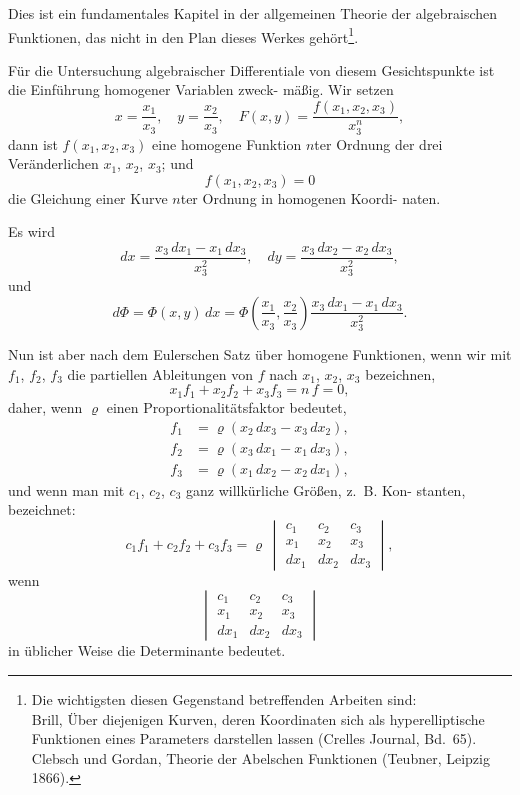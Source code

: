 \documentclass[12pt,a4paper]{book}
\theoremstyle{definition}
\begin{document}
Dies ist ein fundamentales Kapitel in der allgemeinen
Theorie der algebraischen Funktionen, das nicht in den Plan
dieses Werkes geh\"ort\footnote{Die wichtigsten diesen Gegenstand betreffenden Arbeiten sind:\\
Brill, \"Uber diejenigen Kurven, deren Koordinaten sich als hyperelliptische\\
Funktionen eines Parameters darstellen lassen (Crelles Journal, Bd.~65).\\
Clebsch und Gordan, Theorie der Abelschen Funktionen (Teubner, Leipzig 1866).}.

F\"ur die Untersuchung algebraischer Differentiale von diesem
Gesichtspunkte ist die Einf\"uhrung homogener Variablen zweck-
m\"a\ss ig. Wir setzen
\[
x = \frac{x_1}{x_3}, \quad y = \frac{x_2}{x_3}, \quad F(x,y) = \frac{f(x_1, x_2, x_3)}{x_3^n},
\]
dann ist $f(x_1, x_2, x_3)$ eine homogene Funktion $n$ter Ordnung
der drei Ver\"anderlichen $x_1$, $x_2$, $x_3$; und
\begin{equation}
f(x_1, x_2, x_3) = 0 \tag{3}
\end{equation}
die Gleichung einer Kurve $n$ter Ordnung in homogenen Koordi-
naten.

Es wird
\[
dx = \frac{x_3\,dx_1 - x_1\,dx_3}{x_3^2}, \quad dy = \frac{x_3\,dx_2 - x_2\,dx_3}{x_3^2},
\]
und
\begin{equation}
d\Phi = \Phi(x,y)\,dx = \Phi\left(\frac{x_1}{x_3}, \frac{x_2}{x_3}\right) \frac{x_3\,dx_1 - x_1\,dx_3}{x_3^2}. \tag{4}
\end{equation}

Nun ist aber nach dem Eulerschen Satz \"uber homogene
Funktionen, wenn wir mit $f_1$, $f_2$, $f_3$ die partiellen Ableitungen
von $f$ nach $x_1$, $x_2$, $x_3$ bezeichnen,
\[
x_1 f_1 + x_2 f_2 + x_3 f_3 = n\,f = 0,
\]
daher, wenn $\varrho$ einen Proportionalit\"atsfaktor bedeutet,
\[
\begin{aligned}
f_1 &= \varrho(x_2\,dx_3 - x_3\,dx_2),\\
f_2 &= \varrho(x_3\,dx_1 - x_1\,dx_3),\\
f_3 &= \varrho(x_1\,dx_2 - x_2\,dx_1),
\end{aligned}
\]
und wenn man mit $c_1$, $c_2$, $c_3$ ganz willk\"urliche Gr\"o\ss en, z.~B. Kon-
stanten, bezeichnet:
\[
c_1 f_1 + c_2 f_2 + c_3 f_3 = \varrho\,\begin{vmatrix}
c_1 & c_2 & c_3 \\
x_1 & x_2 & x_3 \\
dx_1 & dx_2 & dx_3
\end{vmatrix},
\]
wenn
\[
\begin{vmatrix}
c_1 & c_2 & c_3 \\
x_1 & x_2 & x_3 \\
dx_1 & dx_2 & dx_3
\end{vmatrix}
\]
in \"ublicher Weise die Determinante bedeutet.
\end{document}
